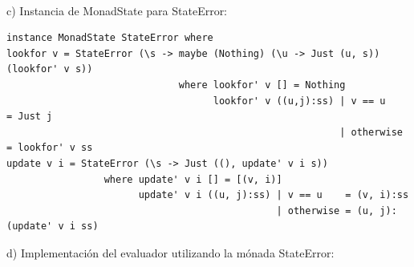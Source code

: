\documentclass{article}
\begin{document}
\paragraph{}
c) Instancia de MonadState para StateError:
\begin{lstlisting}
instance MonadState StateError where
lookfor v = StateError (\s -> maybe (Nothing) (\u -> Just (u, s)) (lookfor' v s))
                              where lookfor' v [] = Nothing
                                    lookfor' v ((u,j):ss) | v == u    = Just j
                                                          | otherwise = lookfor' v ss
update v i = StateError (\s -> Just ((), update' v i s))
                 where update' v i [] = [(v, i)]
                       update' v i ((u, j):ss) | v == u    = (v, i):ss
                                               | otherwise = (u, j):(update' v i ss)    
\end{lstlisting}
\newpage
d) Implementación del evaluador utilizando la mónada StateError:
\end{document}
